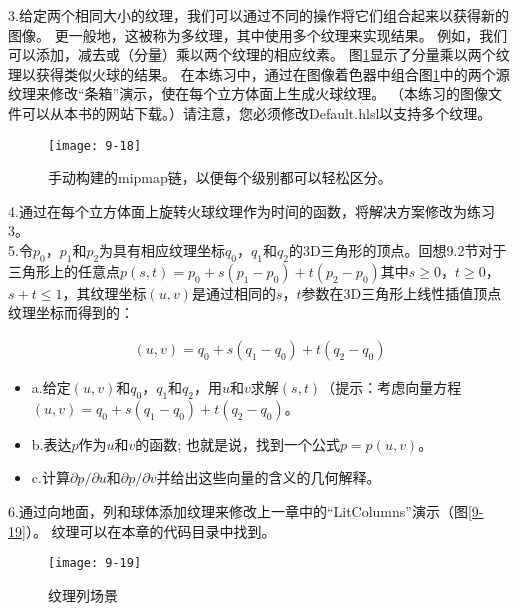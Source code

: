 \begin{flushleft}
3.给定两个相同大小的纹理，我们可以通过不同的操作将它们组合起来以获得新的图像。 更一般地，这被称为多纹理，其中使用多个纹理来实现结果。 例如，我们可以添加，减去或（分量）乘以两个纹理的相应纹素。 图\ref{fig:9-18}显示了分量乘以两个纹理以获得类似火球的结果。 在本练习中，通过在图像着色器中组合图\ref{fig:9-18}中的两个源纹理来修改“条箱”演示，使在每个立方体面上生成火球纹理。 （本练习的图像文件可以从本书的网站下载。）请注意，您必须修改Default.hlsl以支持多个纹理。
\end{flushleft}
\begin{figure}[h]
    \label{fig:9-18}
    \texttt{[image: 9-18]}
    \centering
    \caption{手动构建的mipmap链，以便每个级别都可以轻松区分。}
\end{figure}

\begin{flushleft}
4.通过在每个立方体面上旋转火球纹理作为时间的函数，将解决方案修改为练习3。\\

5.令$p_{0}$，$p_{1}$和$p_{2}$为具有相应纹理坐标$q_{0}$，$q_{1}$和$q_{2}$的3D三角形的顶点。回想9.2节对于三角形上的任意点$p(s,t)=p_{0}+s(p_{1}-p_{0})+t(p_{2}-p_{0})$其中$s\geq 0$，$t\geq 0$，$s+t\leq 1$，其纹理坐标$(u,v)$是通过相同的$s$，$t$参数在3D三角形上线性插值顶点纹理坐标而得到的：\\
\end{flushleft}
\begin{align*}
(u,v)=q_{0}+s(q_{1}-q_{0})+t(q_{2}-q_{0})
\end{align*}

\begin{itemize}
  \item a.给定$(u,v)$和$q_{0}$，$q_{1}$和$q_{2}$，用$u$和$v$求解$(s,t)$（提示：考虑向量方程$(u,v)=q_{0}+s(q_{1}-q_{0})+t(q_{2}-q_{0})$。
  \item b.表达$p$作为$u$和$v$的函数; 也就是说，找到一个公式$p=p(u,v)$。
  \item c.计算$\partial p/\partial u$和$\partial p/\partial v$并给出这些向量的含义的几何解释。
\end{itemize}

\begin{flushleft}
6.通过向地面，列和球体添加纹理来修改上一章中的“LitColumns”演示（图\ref{9-19}）。 纹理可以在本章的代码目录中找到。
\end{flushleft}

\begin{figure}[h]
    \label{fig:9-19}
    \texttt{[image: 9-19]}
    \centering
    \caption{纹理列场景}
\end{figure}





